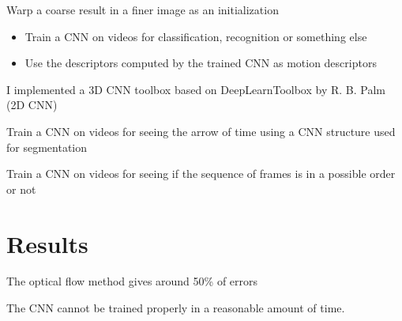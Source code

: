 \documentclass[10pt,a4paper]{report}
\begin{document}
			Warp a coarse result in a finer image as an initialization
		
		
		\begin{itemize}
			\item Train a CNN on videos for classification, recognition or something else
		\item Use the descriptors computed by the trained CNN as motion descriptors
		\end{itemize}
		
		I implemented a 3D CNN toolbox based on DeepLearnToolbox by R. B. Palm (2D CNN)
		\newline
		
		Train a CNN on videos for seeing the arrow of time using a CNN structure used for segmentation
		\newline
		
		Train a CNN on videos for seeing if the sequence of frames is in a possible order or not
		
		\section{Results}
		
			The optical flow method gives around 50\% of errors
			\newline
			
			The CNN cannot be trained properly in a reasonable amount of time.
		
\end{document}
